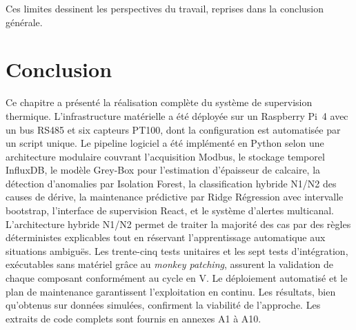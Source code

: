 Ces limites dessinent les perspectives du travail, reprises dans la conclusion générale.

\section*{Conclusion}

Ce chapitre a présenté la réalisation complète du système de supervision thermique. L'infrastructure matérielle a été déployée sur un Raspberry Pi~4 avec un bus RS485 et six capteurs PT100, dont la configuration est automatisée par un script unique. Le pipeline logiciel a été implémenté en Python selon une architecture modulaire couvrant l'acquisition Modbus, le stockage temporel InfluxDB, le modèle Grey-Box pour l'estimation d'épaisseur de calcaire, la détection d'anomalies par Isolation Forest, la classification hybride N1/N2 des causes de dérive, la maintenance prédictive par Ridge Régression avec intervalle bootstrap, l'interface de supervision React, et le système d'alertes multicanal. L'architecture hybride N1/N2 permet de traiter la majorité des cas par des règles déterministes explicables tout en réservant l'apprentissage automatique aux situations ambiguës. Les trente-cinq tests unitaires et les sept tests d'intégration, exécutables sans matériel grâce au \textit{monkey patching}, assurent la validation de chaque composant conformément au cycle en V. Le déploiement automatisé et le plan de maintenance garantissent l'exploitation en continu. Les résultats, bien qu'obtenus sur données simulées, confirment la viabilité de l'approche. Les extraits de code complets sont fournis en annexes A1 à A10.